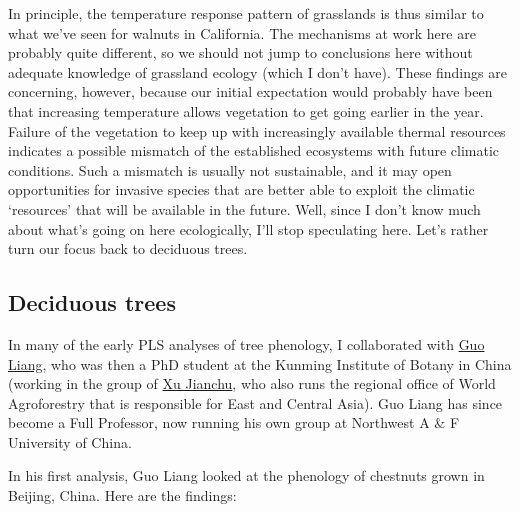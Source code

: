 \documentclass[
]{book}
\begin{document}
In principle, the temperature response pattern of grasslands is thus similar to what we've seen for walnuts in California. The mechanisms at work here are probably quite different, so we should not jump to conclusions here without adequate knowledge of grassland ecology (which I don't have). These findings are concerning, however, because our initial expectation would probably have been that increasing temperature allows vegetation to get going earlier in the year. Failure of the vegetation to keep up with increasingly available thermal resources indicates a possible mismatch of the established ecosystems with future climatic conditions. Such a mismatch is usually not sustainable, and it may open opportunities for invasive species that are better able to exploit the climatic `resources' that will be available in the future. Well, since I don't know much about what's going on here ecologically, I'll stop speculating here. Let's rather turn our focus back to deciduous trees.

\hypertarget{deciduous-trees}{%
\subsection{Deciduous trees}\label{deciduous-trees}}

In many of the early PLS analyses of tree phenology, I collaborated with \href{https://www.researchgate.net/profile/Liang_Guo10}{Guo Liang}, who was then a PhD student at the Kunming Institute of Botany in China (working in the group of \href{https://scholar.google.de/citations?hl=de\&user=N5w0FYQAAAAJ}{Xu Jianchu}, who also runs the regional office of World Agroforestry that is responsible for East and Central Asia). Guo Liang has since become a Full Professor, now running his own group at Northwest A \& F University of China.

In his first analysis, Guo Liang looked at the phenology of chestnuts grown in Beijing, China. Here are the findings:
\end{document}
